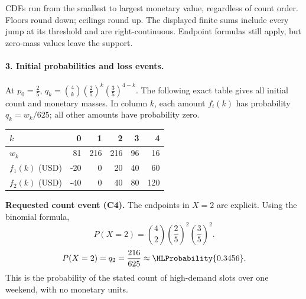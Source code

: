 CDFs run from the smallest to largest monetary value, regardless of count order. Floors round down; ceilings round up. The displayed finite sums include every jump at its threshold and are right-continuous. Endpoint formulas still apply, but zero-mass values leave the support.
\clearpage\paragraph{3. Initial probabilities and loss events.}
At $p_0=\frac{2}{5}$, $q_k=\binom{4}k(\frac{2}{5})^k(\frac{3}{5})^{4-k}$. The following exact table gives all initial count and monetary masses. In column $k$, each amount $f_i(k)$ has probability $q_k=w_k/625$; all other amounts have probability zero.
\begin{center}\begin{tabular}{lrrrrr}\toprule
$k$ & 0 & 1 & 2 & 3 & 4\\\midrule
$w_k$ & 81 & 216 & 216 & 96 & 16\\
$f_1(k)$ (USD) & -20 & 0 & 20 & 40 & 60\\
$f_2(k)$ (USD) & -40 & 0 & 40 & 80 & 120\\
\bottomrule\end{tabular}\end{center}
\textbf{Requested count event (C4).} The endpoints in $X=2$ are explicit. Using the binomial formula,
\[P(X=2)=\binom{4}{2}(\frac{2}{5})^{2}(\frac{3}{5})^{2}.\]
\[P(X=2)=q_{2}=\frac{216}{625}\approx\HLProbability{0.3456}.\]
This is the probability of the stated count of high-demand slots over one weekend, with no monetary units.
\clearpage
